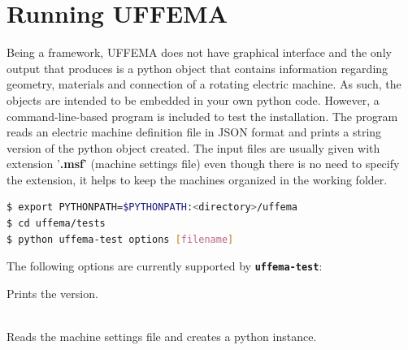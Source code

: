 \documentclass[justified]{tufte-book} %
\begin{document}
\section{Running UFFEMA}
\begin{fullwidth}
Being a framework, UFFEMA does not have graphical interface and the only output that produces is a python object that contains information regarding geometry, materials and connection of a rotating electric machine. As such, the objects are intended to be embedded in your own python code. However, a command-line-based  program is included to test the installation. The program reads an electric machine definition file in JSON format and prints a string version of the python object created. The input files are usually given with extension '\textbf{.msf}' (machine settings file) even though there is no need to specify the extension, it helps to keep the machines organized in the working folder. 
\end{fullwidth}
\begin{lstlisting}[language=bash]
$ export PYTHONPATH=$PYTHONPATH:<directory>/uffema
$ cd uffema/tests
$ python uffema-test options [filename]
\end{lstlisting}

The following options are currently supported by \textbf{\texttt{uffema-test}}:
 \begin{description}[leftmargin=1cm, style=nextline]
\item [{\normalfont\ttfamily{\textbf{-v}}}]  \hfil \newline Prints the version.
 \item [{\normalfont\ttfamily{\textbf{-f}}}]  {} \\ Reads the machine settings file and creates a python instance. 					
 \end{description}

\end{document}
